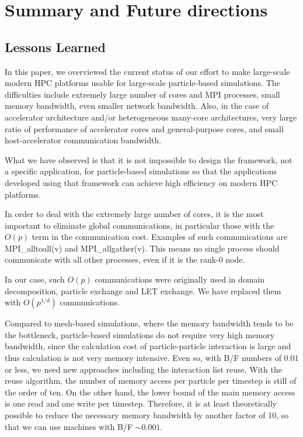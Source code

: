 \section{Summary and Future directions}
\label{sec:summary}

\subsection{Lessons Learned}

In this paper, we overviewed the current status of our effort to make
large-scale modern HPC platforms usable for large-scale particle-based
simulations. The difficulties include extremely large number of cores
and MPI processes, small memory bandwidth, even smaller network
bandwidth. Also, in the case of accelerator architecture and/or
heterogeneous many-core architectures, very large ratio of performance
of accelerator cores and general-purpose cores, and small
host-accelerator communication bandwidth.

What we have observed is that it is not impossible to design the
framework, not a specific application, for particle-based simulations
so that the applications developed using that framework can achieve
high efficiency on modern HPC platforms.

In order to deal with the extremely large number of cores, it is the most
important to eliminate global communications, in particular those with
the $O(p)$ term in the communication cost. Examples of such
communications are MPI\_alltoall(v) and MPI\_allgather(v).
This means no single process should communicate with all other
processes, even if it is the rank-0 node.

In our case, such $O(p)$ communications were originally used in domain
decomposition, particle exchange  and LET exchange. We have replaced them with
$O(p^{1/d})$ communications.

Compared to mesh-based simulations, where the memory bandwidth tends to
be the bottleneck, particle-based simulations do not require very
high memory bandwidth, since the calculation cost of particle-particle
interaction is large and thus calculation is not very memory
intensive. Even so, with B/F numbers of 0.01 or less, we need new
approaches including the interaction list reuse. With the reuse
algorithm, the number of memory access per particle per timestep is
still of the order of ten. On the other hand, the lower bound of the
main memory access is one read and one write per timestep. Therefore,
it is at least theoretically possible to reduce the necessary
memory bandwidth by another factor of 10, so that we can use
machines with B/F $\sim 0.001$.

